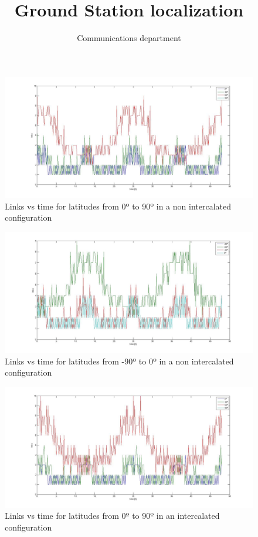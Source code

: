 \documentclass[12pt,a4paper]{report}
\author{Communications department}
\title{Ground Station localization}
\begin{document}
\maketitle

\begin{figure}[H]
\includegraphics[scale=0.3]{0_30_60_90_nd.jpg}
\caption{Links vs time for latitudes from 0º to 90º in a non intercalated configuration}
\end{figure}

\begin{figure}[H]
\includegraphics[scale=0.3]{-90_-60_-30_0_nd.jpg}
\caption{Links vs time for latitudes from -90º to 0º in a non intercalated configuration}
\end{figure}

\begin{figure}[H]
\includegraphics[scale=0.3]{0_30_60_90_d.jpg}
\caption{Links vs time for latitudes from 0º to 90º in an intercalated configuration}
\end{figure}
\end{document}

